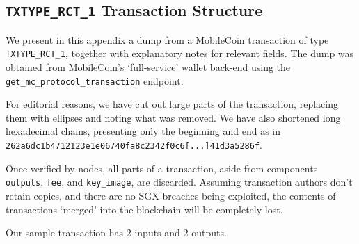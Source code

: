 \begin{appendices}

\renewcommand{\theFancyVerbLine}{%
	\textcolor{red}{\small
		\arabic{FancyVerbLine}}}

\chapter{{\tt TXTYPE\_RCT\_1} Transaction Structure}
\label{appendix:TXTYPE_RCT_1}

We present in this appendix a dump from a MobileCoin transaction of type {\tt TXTYPE\_RCT\_1}, 
together with explanatory notes for relevant fields. The dump was obtained from MobileCoin's `full-service' wallet back-end \cite{mobilecoin-full-service-source-code} using the {\tt get\_mc\_protocol\_transaction} endpoint.

For editorial reasons, we have cut out large parts of the transaction, replacing them with ellipses and noting what was removed. We have also shortened long hexadecimal chains, presenting only the beginning and end as in {\tt 262a6dc1b4712123e1e06740fa8c2342f0c6[...]41d3a5286f}.

Once verified by nodes, all parts of a transaction, aside from components {\tt outputs}, {\tt fee}, and {\tt key\_image}, are discarded. Assuming transaction authors don't retain copies, and there are no SGX breaches being exploited, the contents of transactions `merged' into the blockchain will be completely lost.

Our sample transaction has 2 inputs and 2 outputs.


\end{appendices}
